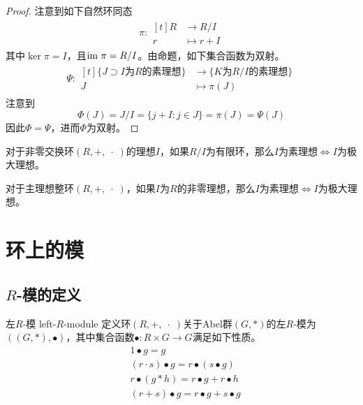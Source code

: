 \begin{proof}
	注意到如下自然环同态
	\begin{align*}
		\pi:\begin{aligned}[t]
			R&\longrightarrow R/I\\
			r&\longmapsto r+I
		\end{aligned}
	\end{align*}
	其中$\ker\pi=I$，且$\text{im } \pi=R/I$。由命题，如下集合函数为双射。
	\begin{align*}
		\Psi:\begin{aligned}[t]
			\{ J\supset I\text{为}R\text{的素理想} \}&\longrightarrow \{ K\text{为}R/I\text{的素理想} \}\\
			J&\longmapsto \pi(J)
		\end{aligned}
	\end{align*}
	注意到
	$$
	\Phi(J)=J/I=\{ j+I:j\in J \}=\pi(J)=\Psi(J)
	$$
	因此$\Phi=\Psi$，进而$\Phi$为双射。
\end{proof}

\begin{proposition}
	对于非零交换环$(R,+,\;\cdot\;)$的理想$I$，如果$R/I$为有限环，那么$I$为素理想$\iff I$为极大理想。
\end{proposition}

\begin{proposition}
	对于主理想整环$(R,+,\;\cdot\;)$，如果$I$为$R$的非零理想，那么$I$为素理想$\iff I$为极大理想。
\end{proposition}

\section{环上的模}

\subsection{$R$-模的定义}

\begin{definition}{左$R$-模 left-$R$-module}
	定义环$(R,+,\;\cdot\;)$关于Abel群$(G,*)$的左$R$-模为$((G,*),\bullet)$，其中集合函数$\bullet:R\times G\to G$满足如下性质。
	\begin{align*}
		&1\bullet g=g\\
		&(r\cdot s)\bullet g=r\bullet(s\bullet g)\\
		&r\bullet(g*h)=r\bullet g+r\bullet h\\
		&(r+s)\bullet g=r\bullet g+s\bullet g
	\end{align*}
\end{definition}

